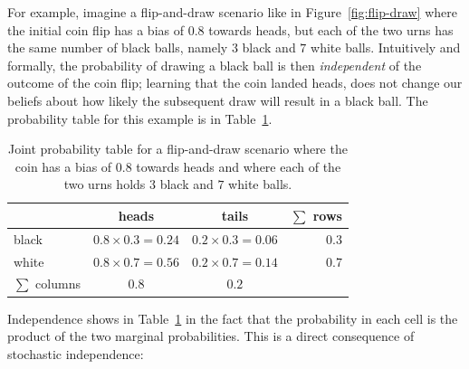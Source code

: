 \documentclass[nobib,nofonts]{tufte-handout}
\newcommand{\mult}{\ensuremath{\cdot}}
\begin{document}
For example, imagine a flip-and-draw scenario like in Figure~\ref{fig:flip-draw} where the initial coin flip has a bias of $0.8$ towards heads, but each of the two urns has the same number of black balls, namely $3$ black and $7$ white balls.
Intuitively and formally, the probability of drawing a black ball is then \emph{independent} of the outcome of the coin flip; learning that the coin landed heads, does not change our beliefs about how likely the subsequent draw will result in a black ball.
The probability table for this example is in Table~\ref{tab:joint-prob-independence}.


\begin{table}
  \centering
  \begin{tabular}{lccr}
                   &heads                    & tails                   & $\sum$ rows \\ \midrule
    black          & $0.8 \times 0.3 = 0.24$ & $0.2 \times 0.3 = 0.06$ & 0.3\\
    white          & $0.8 \times 0.7 = 0.56$ & $0.2 \times 0.7 = 0.14$ & 0.7 \\ \midrule
    $\sum$ columns & $0.8$                   & $0.2$
  \end{tabular}

  \caption{Joint probability table for a flip-and-draw scenario where the coin has a bias of $0.8$ towards heads and where each of the two urns holds $3$ black and $7$ white balls.}
  \label{tab:joint-prob-independence}
\end{table}

Independence shows in Table~\ref{tab:joint-prob-independence} in the fact that the probability in each cell is the product of the two marginal probabilities.
This is a direct consequence of stochastic independence:
\end{document}
